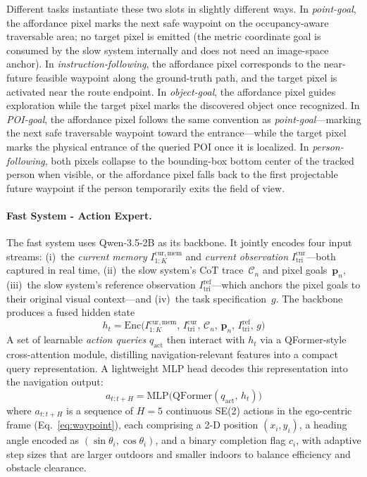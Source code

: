 Different tasks instantiate these two slots in slightly different ways.
In \textit{point-goal}, the affordance pixel marks the next safe
waypoint on the occupancy-aware traversable area; no target pixel is
emitted (the metric coordinate goal is consumed by the slow system
internally and does not need an image-space anchor). In \textit{instruction-following}, the
affordance pixel corresponds to the near-future feasible waypoint along the
ground-truth path, and the target pixel is activated near the route
endpoint. In \textit{object-goal}, the affordance pixel guides exploration
while the target pixel marks the discovered object once recognized. In
\textit{POI-goal}, the affordance pixel follows the same convention as
\textit{point-goal}---marking the next safe traversable waypoint toward the
entrance---while the target pixel marks the physical entrance of the
queried POI once it is localized. In \textit{person-following}, both pixels
collapse to the bounding-box bottom center of the tracked person when
visible, or the affordance pixel falls back to the first projectable future
waypoint if the person temporarily exits the field of view.

\paragraph{Fast System - Action Expert.}
The fast system uses Qwen-3.5-2B as its backbone. It jointly encodes
four input streams: (i)~the \textit{current memory}
$I^{\mathrm{cur,mem}}_{1:K}$ and \textit{current observation}
$I^{\mathrm{cur}}_{\mathrm{tri}}$---both captured in real time,
(ii)~the slow system's CoT trace~$\mathcal{C}_n$ and pixel
goals~$\mathbf{p}_n$, (iii)~the slow system's reference observation
$I^{\mathrm{ref}}_{\mathrm{tri}}$---which anchors the pixel goals to their
original visual context---and (iv)~the task specification~$g$. The backbone
produces a fused hidden state
\begin{equation}
h_t = \mathrm{Enc}\!\bigl(
  I^{\mathrm{cur,mem}}_{1:K},\, I^{\mathrm{cur}}_{\mathrm{tri}},\,
  \mathcal{C}_n,\, \mathbf{p}_n,\, I^{\mathrm{ref}}_{\mathrm{tri}},\, g
\bigr)
\label{eq:fast-hidden}
\end{equation}
A set of learnable \textit{action queries} $q_{\mathrm{act}}$ then
interact with $h_t$ via a QFormer-style cross-attention module,
distilling navigation-relevant features into a compact query
representation. A lightweight MLP head decodes this representation
into the navigation output:
\begin{equation}
a_{t:t+H} = \mathrm{MLP}\!\bigl(\mathrm{QFormer}(q_{\mathrm{act}},\,h_t)\bigr)
\label{eq:fast}
\end{equation}
where $a_{t:t+H}$ is a sequence of $H{=}5$ continuous SE(2) actions
in the ego-centric frame (Eq.~\eqref{eq:waypoint}), each comprising
a 2-D position $(x_i, y_i)$, a heading angle encoded as
$(\sin\theta_i, \cos\theta_i)$, and a binary completion flag $c_i$,
with adaptive step sizes that are larger outdoors and smaller
indoors to balance efficiency and obstacle clearance.

